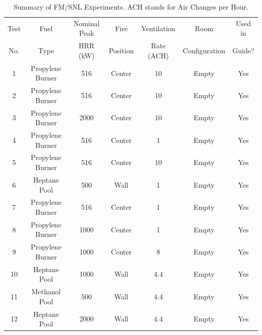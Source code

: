 \begin{table}[h!]
\caption[Summary of FM/SNL Experiments]{Summary of FM/SNL Experiments. ACH stands for Air Changes per Hour.}
\begin{center}
\begin{tabular}{|c|c|c|c|c|c|c|}
\hline
Test    &  Fuel             & Nominal Peak  & Fire          & Ventilation       & Room                  & Used in  \\
No.     &  Type             & HRR (kW)      & Position      & Rate (ACH)        & Configuration         & Guide?      \\ \hline \hline
1       & Propylene Burner  &     516       & Center        & 10                & Empty                 &        Yes \\ \hline
2       & Propylene Burner  &     516       & Center        & 10                & Empty                 &        Yes \\ \hline
3       & Propylene Burner  &    2000       & Center        & 10                & Empty                 &        Yes \\ \hline
4       & Propylene Burner  &     516       & Center        & 1                 & Empty                 &        Yes \\ \hline
5       & Propylene Burner  &     516       & Center        & 10                & Empty                 &        Yes \\ \hline
6       & Heptane Pool      &     500       & Wall          & 1                 & Empty                 &        Yes \\ \hline
7       & Propylene Burner  &     516       & Center        & 1                 & Empty                 &        Yes \\ \hline
8       & Propylene Burner  &    1000       & Center        & 1                 & Empty                 &        Yes \\ \hline
9       & Propylene Burner  &    1000       & Center        & 8                 & Empty                 &        Yes \\ \hline
10      & Heptane Pool      &    1000       & Wall          & 4.4               & Empty                 &        Yes \\ \hline
11      & Methanol Pool     &     500       & Wall          & 4.4               & Empty                 &        Yes \\ \hline
12      & Heptane Pool      &    2000       & Wall          & 4.4               & Empty                 &        Yes \\ \hline

\end{tabular}
\end{center}
\end{table}
